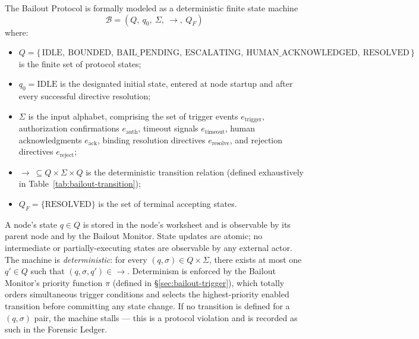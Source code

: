The Bailout Protocol is formally modeled as a deterministic finite state machine
\[
\mathcal{B} = (Q,\ q_0,\ \Sigma,\ \rightarrow,\ Q_F)
\]
where:

\begin{itemize}\itemsep0em
\item $Q = \{\,\text{IDLE},\ \text{BOUNDED},\ \text{BAIL\_PENDING},\ \text{ESCALATING},\ \text{HUMAN\_ACKNOWLEDGED},\ \text{RESOLVED}\,\}$ is the finite set of protocol states;
\item $q_0 = \text{IDLE}$ is the designated initial state, entered at node startup and after every successful directive resolution;
\item $\Sigma$ is the input alphabet, comprising the set of trigger events $e_{\text{trigger}}$, authorization confirmations $e_{\text{auth}}$, timeout signals $e_{\text{timeout}}$, human acknowledgments $e_{\text{ack}}$, binding resolution directives $e_{\text{resolve}}$, and rejection directives $e_{\text{reject}}$;
\item $\rightarrow\ \subseteq Q \times \Sigma \times Q$ is the deterministic transition relation (defined exhaustively in Table~\ref{tab:bailout-transition});
\item $Q_F = \{\text{RESOLVED}\}$ is the set of terminal accepting states.
\end{itemize}

A node's state $q \in Q$ is stored in the node's worksheet and is observable by its parent node and by the Bailout Monitor. State updates are atomic; no intermediate or partially-executing states are observable by any external actor. The machine is \emph{deterministic}: for every $(q, \sigma) \in Q \times \Sigma$, there exists at most one $q' \in Q$ such that $(q, \sigma, q') \in \rightarrow$. Determinism is enforced by the Bailout Monitor's priority function $\pi$ (defined in \S\ref{sec:bailout-trigger}), which totally orders simultaneous trigger conditions and selects the highest-priority enabled transition before committing any state change. If no transition is defined for a $(q, \sigma)$ pair, the machine stalls — this is a protocol violation and is recorded as such in the Forensic Ledger.

